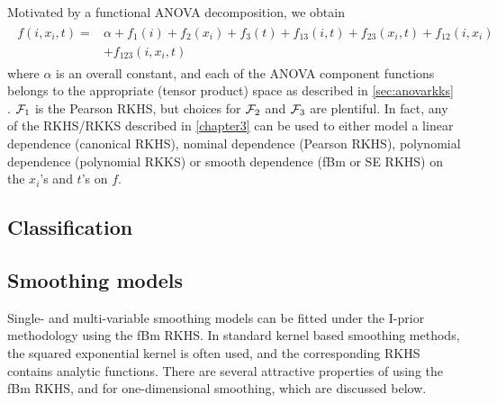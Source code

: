 Motivated by a functional ANOVA decomposition, we obtain
\begin{align}\label{eq:longitudinalanova}
\begin{split}
  f(i,x_i,t) 
  ={}& \alpha + f_1(i) + f_2(x_i) + f_3(t) + f_{13}(i,t) + f_{23}(x_i,t) + f_{12}(i,x_i)  \\
  &+ f_{123}(i,x_i,t)
\end{split}
\end{align}
where $\alpha$ is an overall constant, and each of the ANOVA component functions belongs to the appropriate (tensor product) space as described in \cref{sec:anovarkks} .
${\mathcal F}_1$ is the Pearson RKHS, but choices for ${\mathcal F}_2$ and ${\mathcal F}_3$ are plentiful.
In fact, any of the RKHS/RKKS described in \cref{chapter3} can be used to either model a linear dependence (canonical RKHS), nominal dependence (Pearson RKHS), polynomial dependence (polynomial RKKS) or smooth dependence (fBm or SE RKHS) on the $x_i$'s and $t$'s on $f$.

\subsection{Classification}
\label{sec:naiveclass}


\subsection{Smoothing models}
\label{sec:ipriorsmoothingmod}

Single- and multi-variable smoothing models can be fitted under the I-prior methodology using the fBm RKHS.
In standard kernel based smoothing methods, the squared exponential kernel is often used, and the corresponding RKHS contains analytic functions.
There are several attractive properties of using the fBm RKHS, and for one-dimensional smoothing, which are discussed below.

